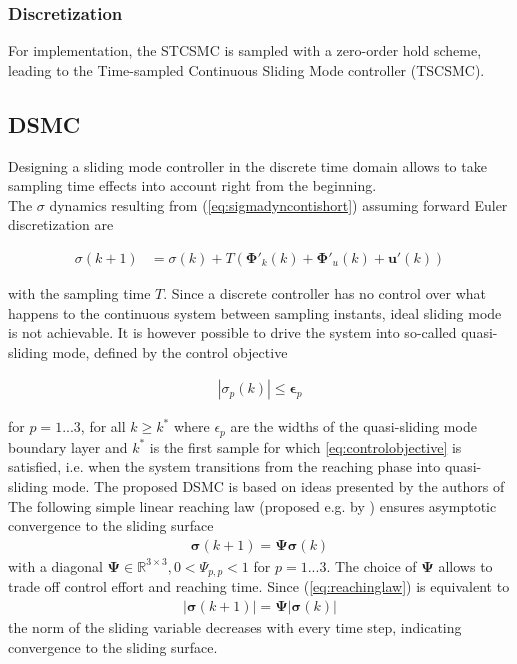 \documentclass{ifacconf}
\providecommand{\mbf}[1]{\mathbf{#1}}
\newcommand{\idxSample}{{\ensuremath{k}}}
\newcommand{\idxAxis}{{\ensuremath{p}}}
\begin{document}
\subsubsection{\textbf{Discretization}}
For implementation, the STCSMC is sampled with a zero-order hold scheme, leading to the Time-sampled Continuous Sliding Mode controller (TSCSMC). 


\subsection{DSMC}
Designing a sliding mode controller in the discrete time domain allows to take sampling time effects into account right from the beginning. \\
The $\sigma$ dynamics resulting from (\ref{eq:sigmadyncontishort}) assuming forward Euler discretization are

\begin{align}
{{\sigma}}(\idxSample+1)
&=
{{\sigma}}(\idxSample)
+
T(
\mbf{\Phi}'_k(\idxSample) + \mbf{\Phi}'_u(\idxSample) + \mbf{u}'(\idxSample))
\label{eq:sigmadyndiscrete}
\end{align}

with the sampling time $T$. Since a discrete controller has no control over what happens to the continuous system between sampling instants, ideal sliding mode is not achievable. It is however possible to drive the system into so-called quasi-sliding mode, defined by the control objective

\begin{align}
|{\sigma}_\idxAxis (\idxSample)| \leq \mbf{\epsilon}_\idxAxis
\label{eq:controlobjective}
\end{align}

for $\idxAxis=1...3$, for all $\idxSample \geq \idxSample^*$ where $\epsilon_\idxAxis$ are the widths of the quasi-sliding mode boundary layer and $\idxSample^*$ is the first sample for which \ref{eq:controlobjective} is satisfied, i.e. when the system transitions from the reaching phase into quasi-sliding mode.
The proposed DSMC is based on ideas presented by the authors of \cite{monsees2001discrete}
The following simple linear reaching law (proposed e.g. by \cite{Spurgeon1992}) ensures asymptotic convergence to the sliding surface
\begin{align}
\mbf{\sigma}(\idxSample+1) = \mbf{\Psi} \mbf{\sigma}(\idxSample)
\label{eq:reachinglaw}
\end{align}
with a diagonal $\mbf{\Psi} \in \mathbb{R}^{3 \times 3}, 0 < \Psi_{\idxAxis,\idxAxis} < 1$ for $\idxAxis=1...3$. The choice of $\mbf{\Psi}$ allows to trade off control effort and reaching time.
Since (\ref{eq:reachinglaw}) is equivalent to
\begin{align}
|\mbf{\sigma}(\idxSample+1)| = \mbf{\Psi} |\mbf{\sigma}(\idxSample)|
\end{align}
the norm of the sliding variable decreases with every time step, indicating convergence to the sliding surface. 
\end{document}

